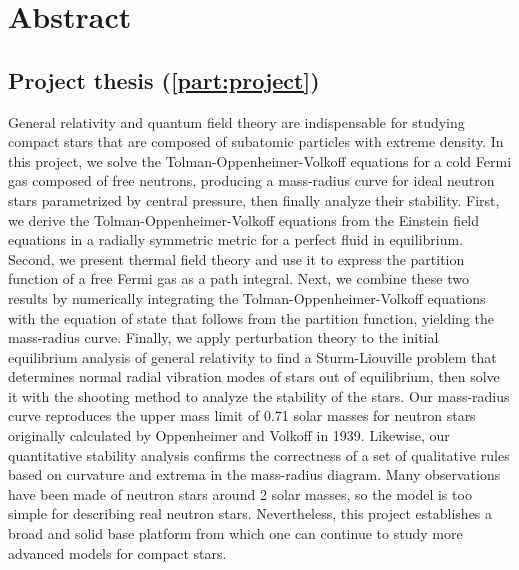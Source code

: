 \chapter{Abstract}

\section*{Project thesis (\cref{part:project})}

General relativity and quantum field theory are indispensable for studying compact stars that are composed of subatomic particles with extreme density.
In this project, we solve the Tolman-Oppenheimer-Volkoff equations for a cold Fermi gas composed of free neutrons, producing a mass-radius curve for ideal neutron stars parametrized by central pressure, then finally analyze their stability.
First, we derive the Tolman-Oppenheimer-Volkoff equations from the Einstein field equations in a radially symmetric metric for a perfect fluid in equilibrium.
Second, we present thermal field theory and use it to express the partition function of a free Fermi gas as a path integral.
Next, we combine these two results by numerically integrating the Tolman-Oppenheimer-Volkoff equations with the equation of state that follows from the partition function, yielding the mass-radius curve.
Finally, we apply perturbation theory to the initial equilibrium analysis of general relativity to find a Sturm-Liouville problem that determines normal radial vibration modes of stars out of equilibrium, then solve it with the shooting method to analyze the stability of the stars.
Our mass-radius curve reproduces the upper mass limit of 0.71 solar masses for neutron stars originally calculated by Oppenheimer and Volkoff in 1939.
Likewise, our quantitative stability analysis confirms the correctness of a set of qualitative rules based on curvature and extrema in the mass-radius diagram.
Many observations have been made of neutron stars around 2 solar masses, so the model is too simple for describing real neutron stars.
Nevertheless, this project establishes a broad and solid base platform from which one can continue to study more advanced models for compact stars.


